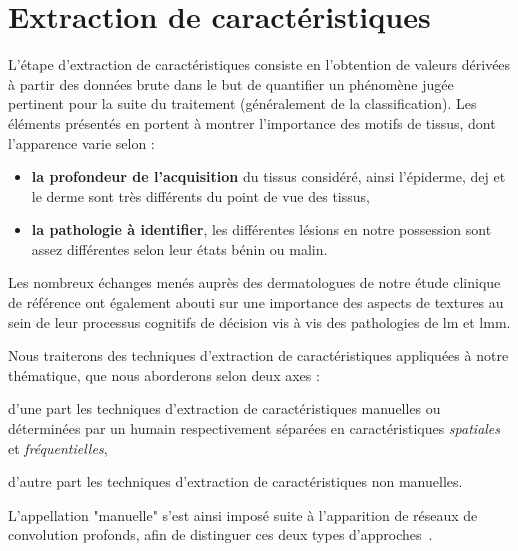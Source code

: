 \newpage

\section{Extraction de caractéristiques}
\label{chap:feature_extraction}
L'étape d'extraction de caractéristiques consiste en l'obtention de valeurs dérivées à partir des données brute dans le but de quantifier un phénomène jugée pertinent pour la suite du traitement (généralement de la classification). Les éléments présentés en  portent à montrer l'importance des motifs de tissus, dont l'apparence varie selon :
\begin{itemize}
    \item \textbf{la profondeur de l'acquisition} du tissus considéré, ainsi l'épiderme, \gls{dej} et le derme sont très différents du point de vue des tissus,
    \item \textbf{la pathologie à identifier}, les différentes lésions en notre possession sont assez différentes selon leur états bénin ou malin.
\end{itemize}
Les nombreux échanges menés auprès des dermatologues de notre étude clinique de référence ont également abouti sur une importance des aspects de textures au sein de leur processus cognitifs de décision vis à vis des pathologies de \gls{lm} et \gls{lmm}.\par

Nous traiterons des techniques d'extraction de caractéristiques appliquées à notre thématique, que nous aborderons selon deux axes :
\begin{inlinerate}
    \item d'une part les techniques d'extraction de caractéristiques manuelles ou déterminées par un humain respectivement séparées en caractéristiques \textit{spatiales} et \textit{fréquentielles},
    \item d'autre part les techniques d'extraction de caractéristiques non manuelles.
\end{inlinerate} 
L'appellation "manuelle" s'est ainsi imposé suite à l'apparition de réseaux de convolution profonds, afin de distinguer ces deux types d'approches~\cite{Nanni2017}.\par

